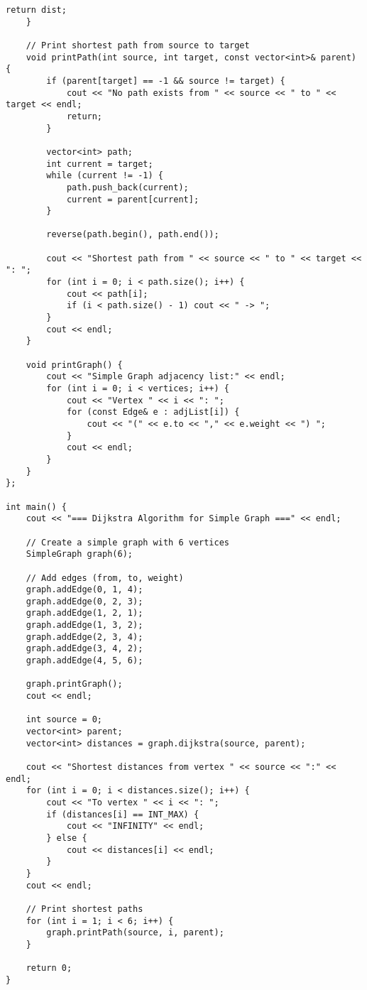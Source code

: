 \documentclass[12pt,a4paper]{article}
\begin{document}
\begin{lstlisting}[caption={Thuật toán Dijkstra cho đồ thị đơn}]
        return dist;
    }
    
    // Print shortest path from source to target
    void printPath(int source, int target, const vector<int>& parent) {
        if (parent[target] == -1 && source != target) {
            cout << "No path exists from " << source << " to " << target << endl;
            return;
        }
        
        vector<int> path;
        int current = target;
        while (current != -1) {
            path.push_back(current);
            current = parent[current];
        }
        
        reverse(path.begin(), path.end());
        
        cout << "Shortest path from " << source << " to " << target << ": ";
        for (int i = 0; i < path.size(); i++) {
            cout << path[i];
            if (i < path.size() - 1) cout << " -> ";
        }
        cout << endl;
    }
    
    void printGraph() {
        cout << "Simple Graph adjacency list:" << endl;
        for (int i = 0; i < vertices; i++) {
            cout << "Vertex " << i << ": ";
            for (const Edge& e : adjList[i]) {
                cout << "(" << e.to << "," << e.weight << ") ";
            }
            cout << endl;
        }
    }
};

int main() {
    cout << "=== Dijkstra Algorithm for Simple Graph ===" << endl;
    
    // Create a simple graph with 6 vertices
    SimpleGraph graph(6);
    
    // Add edges (from, to, weight)
    graph.addEdge(0, 1, 4);
    graph.addEdge(0, 2, 3);
    graph.addEdge(1, 2, 1);
    graph.addEdge(1, 3, 2);
    graph.addEdge(2, 3, 4);
    graph.addEdge(3, 4, 2);
    graph.addEdge(4, 5, 6);
    
    graph.printGraph();
    cout << endl;
    
    int source = 0;
    vector<int> parent;
    vector<int> distances = graph.dijkstra(source, parent);
    
    cout << "Shortest distances from vertex " << source << ":" << endl;
    for (int i = 0; i < distances.size(); i++) {
        cout << "To vertex " << i << ": ";
        if (distances[i] == INT_MAX) {
            cout << "INFINITY" << endl;
        } else {
            cout << distances[i] << endl;
        }
    }
    cout << endl;
    
    // Print shortest paths
    for (int i = 1; i < 6; i++) {
        graph.printPath(source, i, parent);
    }
    
    return 0;
}
\end{lstlisting}
\end{document}
